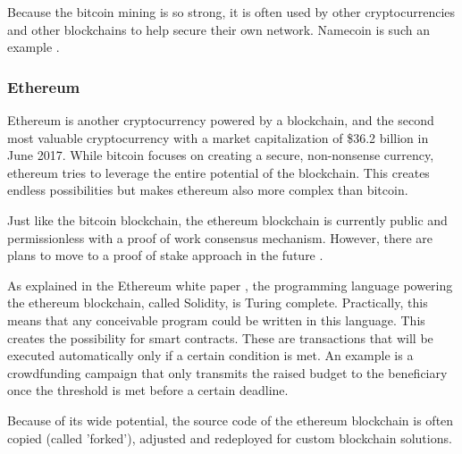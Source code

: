 Because the bitcoin mining is so strong, it is often used by other cryptocurrencies and other blockchains to help secure their own network. Namecoin is such an example \cite{namecoin-whitepaper}.

\subsubsection{Ethereum}

Ethereum is another cryptocurrency powered by a blockchain, and the second most valuable cryptocurrency with a market capitalization of \$36.2 billion in June 2017. While bitcoin focuses on creating a secure, non-nonsense currency, ethereum tries to leverage the entire potential of the blockchain. This creates endless possibilities but makes ethereum also more complex than bitcoin.

Just like the bitcoin blockchain, the ethereum blockchain is currently public and permissionless with a proof of work consensus mechanism. However, there are plans to move to a proof of stake approach in the future \cite{ethereum-pos-faq}. 

As explained in the Ethereum white paper \cite{ethereum-whitepaper}, the programming language powering the ethereum blockchain, called Solidity, is Turing complete. Practically, this means that any conceivable program could be written in this language. This creates the possibility for smart contracts. These are transactions that will be executed automatically only if a certain condition is met. An example is a crowdfunding campaign that only transmits the raised budget to the beneficiary once the threshold is met before a certain deadline.

Because of its wide potential, the source code of the ethereum blockchain is often copied (called 'forked'), adjusted and redeployed for custom blockchain solutions. 


